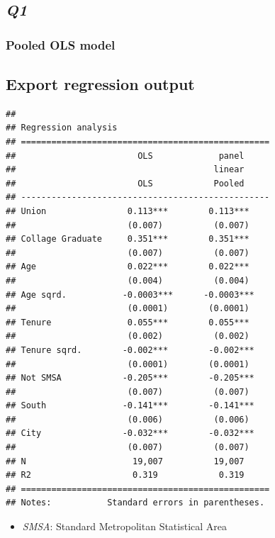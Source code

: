 \documentclass[
]{article}
\providecommand{\tightlist}{%
  \setlength{\itemsep}{0pt}\setlength{\parskip}{0pt}}
\begin{document}
\hypertarget{q1}{%
\subsection{\texorpdfstring{\emph{Q1}}{Q1}}\label{q1}}

\hypertarget{pooled-ols-model}{%
\subsubsection{Pooled OLS model}\label{pooled-ols-model}}

\hypertarget{export-regression-output}{%
\subsection{Export regression output}\label{export-regression-output}}

\begin{verbatim}
## 
## Regression analysis
## =================================================
##                        OLS             panel     
##                                       linear     
##                        OLS            Pooled     
## -------------------------------------------------
## Union                0.113***        0.113***    
##                      (0.007)          (0.007)    
## Collage Graduate     0.351***        0.351***    
##                      (0.007)          (0.007)    
## Age                  0.022***        0.022***    
##                      (0.004)          (0.004)    
## Age sqrd.           -0.0003***      -0.0003***   
##                      (0.0001)        (0.0001)    
## Tenure               0.055***        0.055***    
##                      (0.002)          (0.002)    
## Tenure sqrd.        -0.002***        -0.002***   
##                      (0.0001)        (0.0001)    
## Not SMSA            -0.205***        -0.205***   
##                      (0.007)          (0.007)    
## South               -0.141***        -0.141***   
##                      (0.006)          (0.006)    
## City                -0.032***        -0.032***   
##                      (0.007)          (0.007)    
## N                     19,007          19,007     
## R2                    0.319            0.319     
## =================================================
## Notes:           Standard errors in parentheses.
\end{verbatim}

\begin{itemize}
\tightlist
\item
  \emph{SMSA}: Standard Metropolitan Statistical Area
\end{itemize}
\end{document}
